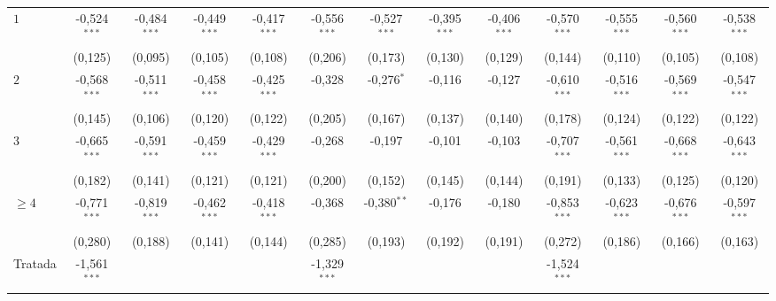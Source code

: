 \begin{tabular}{lcccccccccccc}
   $1$                     &  -0{,}524$^{***}$  &  -0{,}484$^{***}$  &  -0{,}449$^{***}$  &  -0{,}417$^{***}$ &  -0{,}556$^{***}$  &  -0{,}527$^{***}$  &  -0{,}395$^{***}$  &  -0{,}406$^{***}$ &  -0{,}570$^{***}$  &  -0{,}555$^{***}$  &  -0{,}560$^{***}$  &  -0{,}538$^{***}$\\
                           &  (0{,}125)         &  (0{,}095)         &  (0{,}105)         &  (0{,}108) &  (0{,}206)         &  (0{,}173)         &  (0{,}130)         &  (0{,}129) &  (0{,}144)         &  (0{,}110)         &  (0{,}105)         &  (0{,}108)\\
   $2$                     &  -0{,}568$^{***}$  &  -0{,}511$^{***}$  &  -0{,}458$^{***}$  &  -0{,}425$^{***}$ &  -0{,}328          &  -0{,}276$^{*}$    &  -0{,}116          &  -0{,}127 &  -0{,}610$^{***}$  &  -0{,}516$^{***}$  &  -0{,}569$^{***}$  &  -0{,}547$^{***}$\\
                           &  (0{,}145)         &  (0{,}106)         &  (0{,}120)         &  (0{,}122) &  (0{,}205)         &  (0{,}167)         &  (0{,}137)         &  (0{,}140) &  (0{,}178)         &  (0{,}124)         &  (0{,}122)         &  (0{,}122)\\
   $3$                     &  -0{,}665$^{***}$  &  -0{,}591$^{***}$  &  -0{,}459$^{***}$  &  -0{,}429$^{***}$ &  -0{,}268          &  -0{,}197          &  -0{,}101          &  -0{,}103 &  -0{,}707$^{***}$  &  -0{,}561$^{***}$  &  -0{,}668$^{***}$  &  -0{,}643$^{***}$\\
                           &  (0{,}182)         &  (0{,}141)         &  (0{,}121)         &  (0{,}121) &  (0{,}200)         &  (0{,}152)         &  (0{,}145)         &  (0{,}144) &  (0{,}191)         &  (0{,}133)         &  (0{,}125)         &  (0{,}120)\\
   $\geq 4$                &  -0{,}771$^{***}$  &  -0{,}819$^{***}$  &  -0{,}462$^{***}$  &  -0{,}418$^{***}$ &  -0{,}368          &  -0{,}380$^{**}$   &  -0{,}176          &  -0{,}180 &  -0{,}853$^{***}$  &  -0{,}623$^{***}$  &  -0{,}676$^{***}$  &  -0{,}597$^{***}$\\
                           &  (0{,}280)         &  (0{,}188)         &  (0{,}141)         &  (0{,}144) &  (0{,}285)         &  (0{,}193)         &  (0{,}192)         &  (0{,}191) &  (0{,}272)         &  (0{,}186)         &  (0{,}166)         &  (0{,}163)\\
   Tratada                 &  -1{,}561$^{***}$  &                  &                  &     &  -1{,}329$^{***}$  &                  &                  &     &  -1{,}524$^{***}$  &                  &                  &    \\

\end{tabular}
